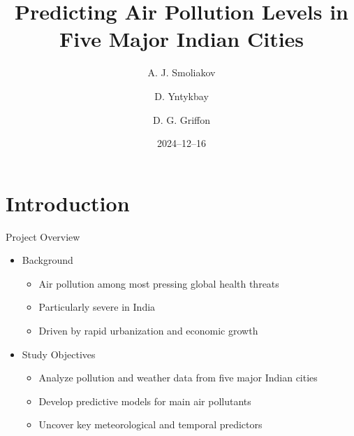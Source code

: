 \documentclass[svgnames, 12pt]{beamer}
\title[Air Pollution in India]{Predicting Air Pollution Levels in Five Major Indian Cities}
\author{A. J. Smoliakov \and D. Yntykbay \and D. G. Griffon}
\institute[VU]{Data Science Study Programme\\Faculty of Mathematics and Informatics}
\date{2024--12--16}
\begin{document}
\begin{frame}
\titlepage
\end{frame}


\section{Introduction}

\begin{frame}{Project Overview}
    \begin{itemize}
        \item Background
            \begin{itemize}
                \item Air pollution among most pressing global health threats
                \item Particularly severe in India
                \item Driven by rapid urbanization and economic growth
            \end{itemize}
        \vspace{1em}
        \item Study Objectives
            \begin{itemize}
                \item Analyze pollution and weather data from five major Indian cities
                \item Develop predictive models for main air pollutants
                \item Uncover key meteorological and temporal predictors
            \end{itemize}
    \end{itemize}
    \vfill
 \end{frame}
\end{document}
